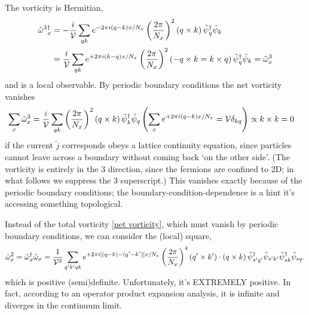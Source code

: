 The vorticity is Hermitian,
\begin{align}
	\tilde{\omega}^3{}^{\dagger}_x
	&=
	-\frac{i}{\mathcal{V}}
	\sum_{qk} e^{-2\pi i (q-k) x / N_x} \left(\frac{2\pi}{N_x}\right)^2 (q \times k)\,
	\tilde{\psi}{}^{\dagger}_{q} \tilde{\psi}_{k}
	\nonumber\\
	&=
	\frac{i}{\mathcal{V}}
	\sum_{qk} e^{+2\pi i (k-q) x / N_x} \left(\frac{2\pi}{N_x}\right)^2 (-q \times k = k \times q)\,
	\tilde{\psi}{}^{\dagger}_{q} \tilde{\psi}_{k}
	=
	\tilde{\omega}^3_x
\end{align}
and is a local observable.
By periodic boundary conditions the net vorticity vanishes
\begin{align}
	\sum_x \tilde{\omega}^3_x 
	&=
	\frac{i}{\mathcal{V}}
	\sum_{qk} \left(\frac{2\pi}{N_x}\right)^2
	(q \times k)\,
	\tilde{\psi}{}^{\dagger}_{k} \tilde{\psi}_{q}
	\left(\sum_x e^{+2\pi i (q-k) x / N_x} = \mathcal{V} \delta_{kq}\right)
	\propto
	k \times k
	=
	0
	\label{eq:net vorticity}
\end{align}
if the current $\tilde{j}$ corresponds obeys a lattice continuity equation, since particles cannot leave across a boundary without coming back `on the other side'.
(The vorticity is entirely in the 3 direction, since the fermions are confined to 2D; in what follows we suppress the 3 superscript.)
This vanishes exactly because of the periodic boundary conditions; the boundary-condition-dependence is a hint it's accessing something topological.

Instead of the total vorticity \eqref{net vorticity}, which must vanish by periodic boundary conditions, we can consider the (local) square,
\begin{align}
	\tilde{\omega}^2_x = \tilde{\omega}{}^{\dagger}_x \tilde{\omega}_x
	=
	\frac{1}{\mathcal{V}^2} \sum_{q'k'qk} e^{+2\pi i[ (q-k) - (q'-k') ] x / N_x}
	\left(\frac{2\pi}{N_x}\right)^4 (q' \times k') \cdot (q \times k)\,
	\tilde{\psi}{}^{\dagger}_{s'q'} \tilde{\psi}_{s'k'} \tilde{\psi}{}^{\dagger}_{sk} \tilde{\psi}_{sq}.
\end{align}
which is positive (semi)definite.
Unfortunately, it's EXTREMELY positive.
In fact, according to an operator product expansion analysis, it is infinite and diverges in the continuum limit.

